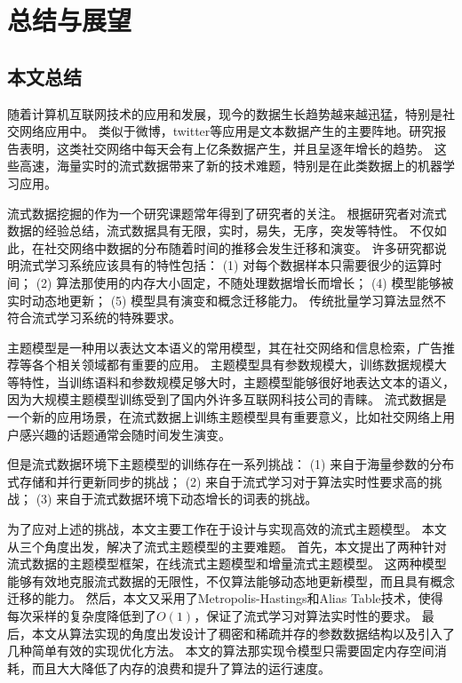 \chapter{总结与展望}
\label{chapter:summary}
\section{本文总结}

随着计算机互联网技术的应用和发展，现今的数据生长趋势越来越迅猛，特别是社交网络应用中。
类似于微博，twitter等应用是文本数据产生的主要阵地。研究报告表明，这类社交网络中每天会有上亿条数据产生，并且呈逐年增长的趋势。
这些高速，海量实时的流式数据带来了新的技术难题，特别是在此类数据上的机器学习应用。

流式数据挖掘的作为一个研究课题常年得到了研究者的关注。
根据研究者对流式数据的经验总结，流式数据具有无限，实时，易失，无序，突发等特性。
不仅如此，在社交网络中数据的分布随着时间的推移会发生迁移和演变。
许多研究都说明流式学习系统应该具有的特性包括：
(1) 对每个数据样本只需要很少的运算时间；
(2) 算法那使用的内存大小固定，不随处理数据增长而增长；
(4) 模型能够被实时动态地更新；
(5) 模型具有演变和概念迁移能力。
传统批量学习算法显然不符合流式学习系统的特殊要求。

主题模型是一种用以表达文本语义的常用模型，其在社交网络和信息检索，广告推荐等各个相关领域都有重要的应用。
主题模型具有参数规模大，训练数据规模大等特性，当训练语料和参数规模足够大时，主题模型能够很好地表达文本的语义，
因为大规模主题模型训练受到了国内外许多互联网科技公司的青睐。
流式数据是一个新的应用场景，在流式数据上训练主题模型具有重要意义，比如社交网络上用户感兴趣的话题通常会随时间发生演变。

但是流式数据环境下主题模型的训练存在一系列挑战：
(1) 来自于海量参数的分布式存储和并行更新同步的挑战；
(2) 来自于流式学习对于算法实时性要求高的挑战；
(3) 来自于流式数据环境下动态增长的词表的挑战。

为了应对上述的挑战，本文主要工作在于设计与实现高效的流式主题模型。
本文从三个角度出发，解决了流式主题模型的主要难题。
首先，本文提出了两种针对流式数据的主题模型框架，在线流式主题模型和增量流式主题模型。
这两种模型能够有效地克服流式数据的无限性，不仅算法能够动态地更新模型，而且具有概念迁移的能力。
然后，本文又采用了Metropolis-Hastings和Alias Table技术，使得每次采样的复杂度降低到了$O(1)$，保证了流式学习对算法实时性的要求。
最后，本文从算法实现的角度出发设计了稠密和稀疏并存的参数数据结构以及引入了几种简单有效的实现优化方法。
本文的算法那实现令模型只需要固定内存空间消耗，而且大大降低了内存的浪费和提升了算法的运行速度。


